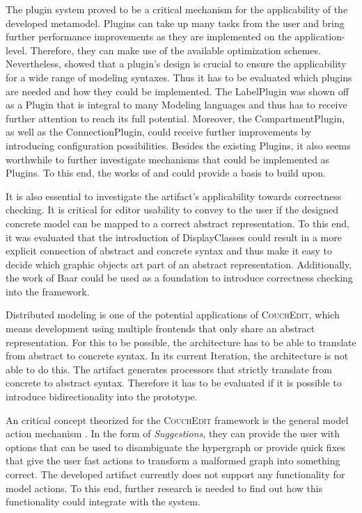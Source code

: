 The plugin system proved to be a critical mechanism for the applicability of the developed metamodel. Plugins can take up many tasks from the user and bring further performance improvements as they are implemented on the application-level. Therefore, they can make use of the available optimization schemes. Nevertheless,  showed that a plugin's design is crucial to ensure the applicability for a wide range of modeling syntaxes. Thus it has to be evaluated which plugins are needed and how they could be implemented. The LabelPlugin was shown off as a Plugin that is integral to many Modeling languages and thus has to receive further attention to reach its full potential. Moreover, the CompartmentPlugin, as well as the ConnectionPlugin, could receive further improvements by introducing configuration possibilities. Besides the existing Plugins, it also seems worthwhile to further investigate mechanisms that could be implemented as Plugins. To this end, the works of \cite{van_tendeloo_concrete_2017} and \cite{costagliola_classification_2002} could provide a basis to build upon. 

It is also essential to investigate the artifact's applicability towards correctness checking. It is critical for editor usability to convey to the user if the designed concrete model can be mapped to a correct abstract representation. To this end, it was evaluated that the introduction of DisplayClasses could result in a more explicit connection of abstract and concrete syntax and thus make it easy to decide which graphic objects art part of an abstract representation. Additionally, the work of Baar \cite{baar_correctly_2008} could be used as a foundation to introduce correctness checking into the framework.

Distributed modeling is one of the potential applications of \textsc{CouchEdit}, which means development using multiple frontends that only share an abstract representation. For this to be possible, the architecture has to be able to translate from abstract to concrete syntax. In its current Iteration, the architecture is not able to do this. The artifact generates processors that strictly translate from concrete to abstract syntax. Therefore it has to be evaluated if it is possible to introduce bidirectionality into the prototype. 


An critical concept theorized for the \textsc{CouchEdit} framework is the general model action mechanism \cite{nachreiner_couchedit_2020}. In the form of \emph{Suggestions}, they can provide the user with options that can be used to disambiguate the hypergraph or provide quick fixes that give the user fast actions to transform a malformed graph into something correct. The developed artifact currently does not support any functionality for model actions. To this end, further research is needed to find out how this functionality could integrate with the system.

